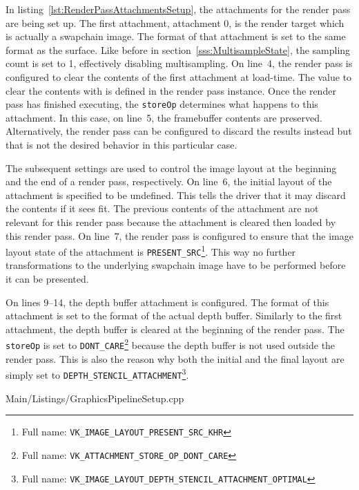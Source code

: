         In listing~\ref{lst:RenderPassAttachmentsSetup}, the attachments for the render pass are being set up.
        The first attachment, attachment 0, is the render target which is actually a swapchain image.
        The format of that attachment is set to the same format as the surface.
        Like before in section~\ref{sss:MultisampleState}, the sampling count is set to 1, effectively disabling multisampling.
        On line~4, the render pass is configured to clear the contents of the first attachment at load-time.
        The value to clear the contents with is defined in the render pass instance.
        Once the render pass has finished executing, the \lstinline{storeOp} determines what happens to this attachment.
        In this case, on line~5, the framebuffer contents are preserved.
        Alternatively, the render pass can be configured to discard the results instead but that is not the desired behavior in this particular case.

        The subsequent settings are used to control the image layout at the beginning and the end of a render pass, respectively.
        On line~6, the initial layout of the attachment is specified to be undefined.
        This tells the \gls{driver} that it may discard the contents if it sees fit.
        The previous contents of the attachment are not relevant for this render pass because the attachment is cleared then loaded by this render pass.
        On line~7, the render pass is configured to ensure that the image layout state of the attachment is \lstinline{PRESENT_SRC}\footnote{Full name: \lstinline{VK_IMAGE_LAYOUT_PRESENT_SRC_KHR}}.
        This way no further transformations to the underlying swapchain image have to be performed before it can be presented.

        On lines 9--14, the depth buffer attachment is configured.
        The format of this attachment is set to the format of the actual depth buffer.
        Similarly to the first attachment, the depth buffer is cleared at the beginning of the render pass.
        The \lstinline{storeOp} is set to \lstinline{DONT_CARE}\footnote{Full name: \lstinline{VK_ATTACHMENT_STORE_OP_DONT_CARE}} because the depth buffer is not used outside the render pass.
        This is also the reason why both the initial and the final layout are simply set to \lstinline{DEPTH_STENCIL_ATTACHMENT}\footnote{Full name: \lstinline{VK_IMAGE_LAYOUT_DEPTH_STENCIL_ATTACHMENT_OPTIMAL}}.

        
        {Main/Listings/GraphicsPipelineSetup.cpp}

